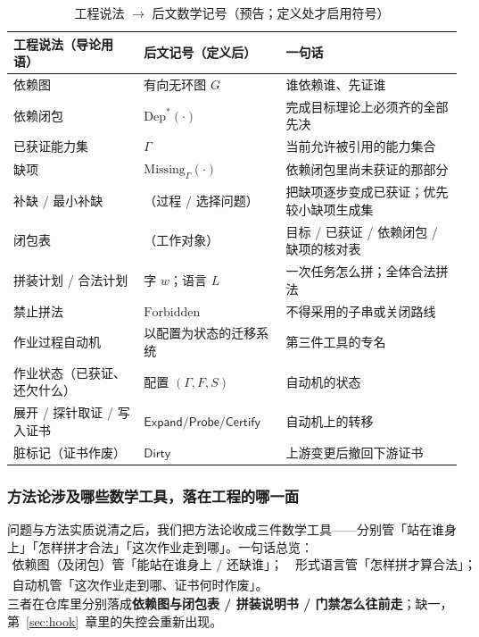 \documentclass[UTF8,a4paper,11pt]{ctexart}
\theoremstyle{definition}
\theoremstyle{plain}
\theoremstyle{remark}
\numberwithin{figure}{section}
\numberwithin{table}{section}
\begin{document}
\begin{table}[H]
\centering\small
\caption{工程说法 $\to$ 后文数学记号（预告；定义处才启用符号）}
\label{tab:ch3-term-bridge}
\begin{tabular}{@{}L{3.2cm} L{3.6cm} L{6.4cm}@{}}
  \toprule
  工程说法（导论用语） & 后文记号（定义后） & 一句话 \\
  \midrule
  依赖图 & 有向无环图 $G$ & 谁依赖谁、先证谁 \\
  依赖闭包 & $\mathrm{Dep}^{*}(\cdot)$ & 完成目标理论上必须齐的全部先决 \\
  已获证能力集 & $\Gamma$ & 当前允许被引用的能力集合 \\
  缺项 & $\mathrm{Missing}_{\Gamma}(\cdot)$ & 依赖闭包里尚未获证的那部分 \\
  补缺 / 最小补缺 & （过程 / 选择问题） & 把缺项逐步变成已获证；优先较小缺项生成集 \\
  闭包表 & （工作对象） & 目标 / 已获证 / 依赖闭包 / 缺项的核对表 \\
  拼装计划 / 合法计划 & 字 $w$；语言 $L$ & 一次任务怎么拼；全体合法拼法 \\
  禁止拼法 & $\mathrm{Forbidden}$ & 不得采用的子串或关闭路线 \\
  作业过程自动机 & 以配置为状态的迁移系统 & 第三件工具的专名 \\
  作业状态（已获证、还欠什么） & 配置 $(\Gamma,F,S)$ & 自动机的状态 \\
  展开 / 探针取证 / 写入证书 & $\mathsf{Expand}/\mathsf{Probe}/\mathsf{Certify}$ & 自动机上的转移 \\
  脏标记（证书作废） & $\mathsf{Dirty}$ & 上游变更后撤回下游证书 \\
  \bottomrule
\end{tabular}
\end{table}

\subsubsection{方法论涉及哪些数学工具，落在工程的哪一面}

问题与方法实质说清之后，我们把方法论收成三件数学工具——分别管「站在谁身上」「怎样拼才合法」「这次作业走到哪」。一句话总览：
\[
\begin{array}{c}
\text{依赖图（及闭包）管「能站在谁身上 / 还缺谁」；}\quad
\text{形式语言管「怎样拼才算合法」；}\\[0.35em]
\text{自动机管「这次作业走到哪、证书何时作废」。}
\end{array}
\]
三者在仓库里分别落成\textbf{依赖图与闭包表 / 拼装说明书 / 门禁怎么往前走}；缺一，第~\ref{sec:hook}~章里的失控会重新出现。
\end{document}
